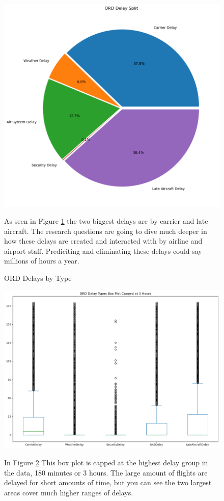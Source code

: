 \documentclass[a4paper,12pt]{article}
\begin{document}
\begin{figure}
    \centering
    \includegraphics*[scale=.5]{../../img/ord_delay_split_pie.png}
    \caption[Delays by Type]{ORD Delays by Type}
    \label{fig:delaybytype}
    As seen in Figure \ref{fig:delaybytype} the two biggest delays are by carrier and late aircraft. The research questions are going to dive much deeper in how these delays are created and interacted with by airline and airport staff. Prediciting and eliminating 
    these delays could say millions of hours a year.
\end{figure}


\begin{figure}
    \centering
    \includegraphics*[scale=.40]{../../img/3h_box.png}
    \caption[]{}
    \label{fig:3hbox}
    In Figure \ref{fig:3hbox} This box plot is capped at the highest delay group in the data, 180 minutes or 3 hours. The large amount of flights are delayed for short amounts of time, but you can see the 
    two largest areas cover much higher ranges of delays.    
\end{figure}
\end{document}
